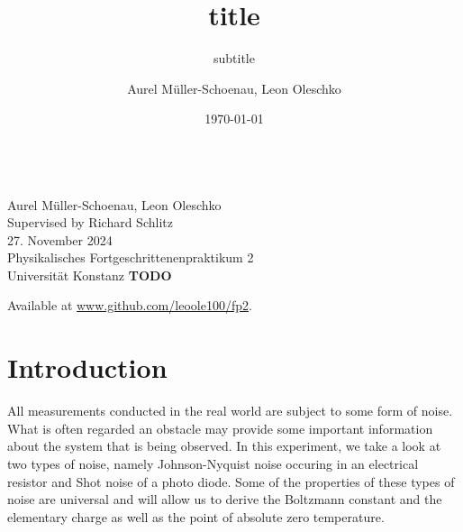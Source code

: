 \documentclass[
    parskip=half, 
    twoside=false,
    twocolumn=true,
    fontsize=11pt,
]{scrarticle}
\begin{document}
\title{title}
\subtitle{subtitle}
\author{Aurel Müller-Schoenau, Leon Oleschko}
\date{\dotdate\today}


\begin{titlepage}
    \sffamily
    \vspace*{3cm}
    {
        \fontsize{32}{32}
    }
    \vspace{.25cm}\\
    {
        \Large
        Aurel Müller-Schoenau, Leon Oleschko\\
        Supervised by Richard Schlitz
        \vspace{.05cm}\\
        27. November 2024
        \vspace{.25cm}\\
        \normalsize
        Physikalisches Fortgeschrittenenpraktikum 2\\
        Universität Konstanz
    }
    \vfill
    {
        \normalfont\normalsize
        \textbf{TODO}
    }
    \vfill
    \begin{flushright}
        Available at \url{www.github.com/leoole100/fp2}.
    \end{flushright}
\end{titlepage}

\section{Introduction}

All measurements conducted in the real world are subject to some form of noise. What is often regarded an obstacle may provide some important information about the system that is being observed. In this experiment, we take a look at two types of noise, namely Johnson-Nyquist noise occuring in an electrical resistor and Shot noise of a photo diode. Some of the properties of these types of noise are universal and will allow us to derive the Boltzmann constant and the elementary charge as well as the point of absolute zero temperature.
\end{document}
